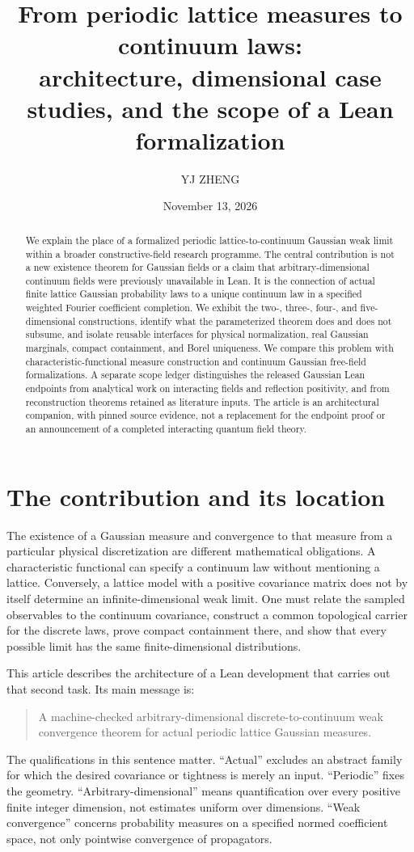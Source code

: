 \documentclass[11pt]{amsart}
\title[From lattice measures to continuum laws]{From periodic lattice measures to continuum laws:\\architecture, dimensional case studies, and the scope of a Lean formalization}
\author{YJ ZHENG}
\date{November 13, 2026}
\theoremstyle{remark}\newtheorem{remark}[theorem]{Remark}
\begin{document}
\begin{abstract}
We explain the place of a formalized periodic lattice-to-continuum Gaussian weak limit within a broader constructive-field research programme. The central contribution is not a new existence theorem for Gaussian fields or a claim that arbitrary-dimensional continuum fields were previously unavailable in Lean. It is the connection of actual finite lattice Gaussian probability laws to a unique continuum law in a specified weighted Fourier coefficient completion. We exhibit the two-, three-, four-, and five-dimensional constructions, identify what the parameterized theorem does and does not subsume, and isolate reusable interfaces for physical normalization, real Gaussian marginals, compact containment, and Borel uniqueness. We compare this problem with characteristic-functional measure construction and continuum Gaussian free-field formalizations. A separate scope ledger distinguishes the released Gaussian Lean endpoints from analytical work on interacting fields and reflection positivity, and from reconstruction theorems retained as literature inputs. The article is an architectural companion, with pinned source evidence, not a replacement for the endpoint proof or an announcement of a completed interacting quantum field theory.
\end{abstract}
\maketitle

\section{The contribution and its location}
The existence of a Gaussian measure and convergence to that measure from a particular physical discretization are different mathematical obligations. A characteristic functional can specify a continuum law without mentioning a lattice. Conversely, a lattice model with a positive covariance matrix does not by itself determine an infinite-dimensional weak limit. One must relate the sampled observables to the continuum covariance, construct a common topological carrier for the discrete laws, prove compact containment there, and show that every possible limit has the same finite-dimensional distributions.

This article describes the architecture of a Lean development that carries out that second task. Its main message is:
\begin{quote}
A machine-checked arbitrary-dimensional discrete-to-continuum weak convergence theorem for actual periodic lattice Gaussian measures.
\end{quote}
The qualifications in this sentence matter. ``Actual'' excludes an abstract family for which the desired covariance or tightness is merely an input. ``Periodic'' fixes the geometry. ``Arbitrary-dimensional'' means quantification over every positive finite integer dimension, not estimates uniform over dimensions. ``Weak convergence'' concerns probability measures on a specified normed coefficient space, not only pointwise convergence of propagators.
\end{document}
